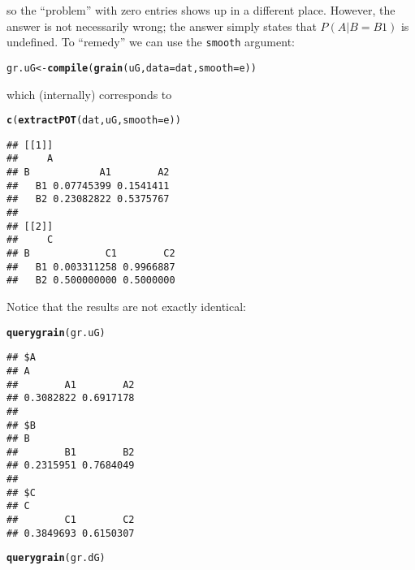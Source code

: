 \documentclass[10pt]{article}\usepackage[]{graphicx}\usepackage[]{color}
\makeatletter
\newcommand{\hlstd}[1]{\textcolor[rgb]{0.345,0.345,0.345}{#1}}%
\newcommand{\hlkwb}[1]{\textcolor[rgb]{0.69,0.353,0.396}{#1}}%
\newcommand{\hlkwc}[1]{\textcolor[rgb]{0.333,0.667,0.333}{#1}}%
\newcommand{\hlkwd}[1]{\textcolor[rgb]{0.737,0.353,0.396}{\textbf{#1}}}%
\newenvironment{kframe}{%
 \def\at@end@of@kframe{}%
 \ifinner\ifhmode%
  \def\at@end@of@kframe{\end{minipage}}%
  \begin{minipage}{\columnwidth}%
 \fi\fi%
 \def\FrameCommand##1{\hskip\@totalleftmargin \hskip-\fboxsep
 \colorbox{shadecolor}{##1}\hskip-\fboxsep
     \hskip-\linewidth \hskip-\@totalleftmargin \hskip\columnwidth}%
 \MakeFramed {\advance\hsize-\width
   \@totalleftmargin\z@ \linewidth\hsize
   \@setminipage}}%
 {\par\unskip\endMakeFramed%
 \at@end@of@kframe}
\newenvironment{knitrout}{}{} %
\def\code#1{{\texttt{#1}}}
\makeatother
\begin{document}
so the ``problem'' with zero entries shows up in a different
place. However, the answer is not necessarily wrong; the answer simply
states that $P(A|B=B1)$ is undefined.
To ``remedy'' we can use the \code{smooth} argument:
\begin{knitrout}
\color{fgcolor}\begin{kframe}
\begin{alltt}
\hlstd{gr.uG} \hlkwb{<-} \hlkwd{compile}\hlstd{(}\hlkwd{grain}\hlstd{(uG,} \hlkwc{data}\hlstd{=dat,} \hlkwc{smooth}\hlstd{=e))}
\end{alltt}
\end{kframe}
\end{knitrout}
which (internally) corresponds to
\begin{knitrout}
\color{fgcolor}\begin{kframe}
\begin{alltt}
\hlkwd{c}\hlstd{(}\hlkwd{extractPOT}\hlstd{(dat, uG,} \hlkwc{smooth}\hlstd{=e))}
\end{alltt}
\begin{verbatim}
## [[1]]
##     A
## B            A1        A2
##   B1 0.07745399 0.1541411
##   B2 0.23082822 0.5375767
## 
## [[2]]
##     C
## B             C1        C2
##   B1 0.003311258 0.9966887
##   B2 0.500000000 0.5000000
\end{verbatim}
\end{kframe}
\end{knitrout}

Notice that the results are not exactly identical:

\begin{knitrout}
\color{fgcolor}\begin{kframe}
\begin{alltt}
\hlkwd{querygrain}\hlstd{(gr.uG)}
\end{alltt}
\begin{verbatim}
## $A
## A
##        A1        A2 
## 0.3082822 0.6917178 
## 
## $B
## B
##        B1        B2 
## 0.2315951 0.7684049 
## 
## $C
## C
##        C1        C2 
## 0.3849693 0.6150307
\end{verbatim}
\begin{alltt}
\hlkwd{querygrain}\hlstd{(gr.dG)}
\end{alltt}


{\ttfamily\noindent\bfseries\color{errorcolor}{\#\# Error in querygrain(gr.dG): object 'gr.dG' not found}}\end{kframe}
\end{knitrout}
\end{document}

